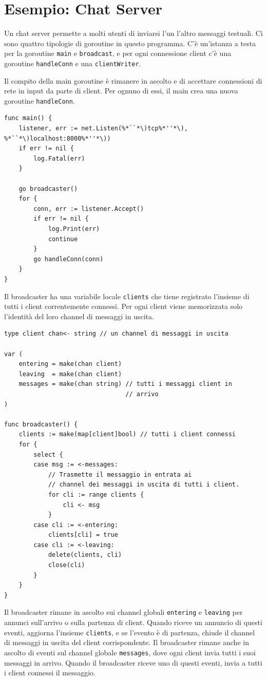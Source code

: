 \section{Esempio: Chat Server}
\label{sec:esempio_chat_server}%
Un chat server permette a molti utenti di inviarsi l'un l'altro messaggi testuali.
Ci sono quattro tipologie di goroutine in questo programma.
C'è un'istanza a testa per la goroutine \verb|main| e \verb|broadcast|, e per ogni connessione client c'è una goroutine \verb|handleConn| e una \verb|clientWriter|.

Il compito della main goroutine è rimanere in ascolto e di accettare connessioni di rete in input da parte di client.
Per ognuno di essi, il main crea una nuova goroutine \verb|handleConn|.
\begin{lstlisting}[frame=single, label={lst:lstlisting7-10.1}]
func main() {
    listener, err := net.Listen(%*``*\)tcp%*''*\), %*``*\)localhost:8000%*''*\))
    if err != nil {
        log.Fatal(err)
    }

    go broadcaster()
    for {
        conn, err := listener.Accept()
        if err != nil {
            log.Print(err)
            continue
        }
        go handleConn(conn)
    }
}
\end{lstlisting}
Il broadcaster ha una variabile locale \verb|clients| che tiene registrato l'insieme di tutti i client correntemente connessi.
Per ogni client viene memorizzata solo l'identità del loro channel di messaggi in uscita.
\begin{lstlisting}[frame=single, label={lst:lstlisting7-10.2}]
type client chan<- string // un channel di messaggi in uscita

var (
    entering = make(chan client)
    leaving  = make(chan client)
    messages = make(chan string) // tutti i messaggi client in
                                 // arrivo
)

func broadcaster() {
    clients := make(map[client]bool) // tutti i client connessi
    for {
        select {
        case msg := <-messages:
            // Trasmette il messaggio in entrata ai
            // channel dei messaggi in uscita di tutti i client.
            for cli := range clients {
                cli <- msg
            }
        case cli := <-entering:
            clients[cli] = true
        case cli := <-leaving:
            delete(clients, cli)
            close(cli)
        }
    }
}
\end{lstlisting}
Il broadcaster rimane in ascolto sui channel globali \verb|entering| e \verb|leaving| per annunci sull'arrivo o sulla partenza di client.
Quando riceve un annuncio di questi eventi, aggiorna l'insieme \verb|clients|, e se l'evento è di partenza, chiude il channel di messaggi in uscita del client corrispondente.
Il broadcaster rimane anche in ascolto di eventi sul channel globale \verb|messages|, dove ogni client invia tutti i suoi messaggi in arrivo.
Quando il broadcaster riceve uno di questi eventi, invia a tutti i client connessi il messaggio.


